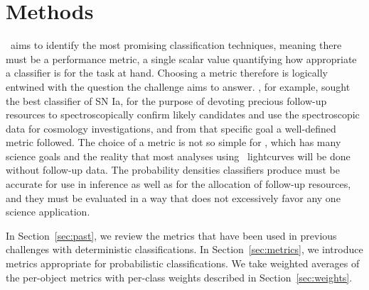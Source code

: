 \section{Methods}
\label{sec:methods}


\plasticc\ aims to identify the most promising classification techniques, meaning there must be a performance metric, a single scalar value quantifying how appropriate a classifier is for the task at hand.
Choosing a metric therefore is logically entwined with the question the challenge aims to answer.
\snphotcc, for example, sought the best classifier of SN Ia, for the purpose of devoting precious follow-up resources to spectroscopically confirm likely candidates and use the spectroscopic data for cosmology investigations, and from that specific goal a well-defined metric followed.
The choice of a metric is not so simple for \plasticc, which has many science goals and the reality that most analyses using \lsst\ lightcurves will be done without follow-up data.
The probability densities classifiers produce must be accurate for use in inference as well as for the allocation of follow-up resources, and they must be evaluated in a way that does not excessively favor any one science application.

In Section~\ref{sec:past}, we review the metrics that have been used in previous challenges with deterministic classifications.
In Section~\ref{sec:metrics}, we introduce metrics appropriate for probabilistic classifications.
We take weighted averages of the per-object metrics with per-class weights described in Section~\ref{sec:weights}.

